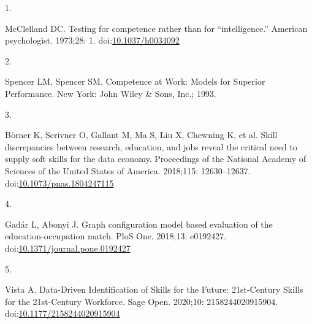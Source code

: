 \documentclass[10pt,letterpaper]{article}
\newlength{\cslhangindent}
\newlength{\csllabelwidth}
\newenvironment{CSLReferences}[2] %
 {\begin{list}{}{%
  \setlength{\itemindent}{0pt}
  \setlength{\leftmargin}{0pt}
  \setlength{\parsep}{0pt}
  \ifodd #1
   \setlength{\leftmargin}{\cslhangindent}
   \setlength{\itemindent}{-1\cslhangindent}
  \fi
  \setlength{\itemsep}{#2\baselineskip}}}
 {\end{list}}
\newcommand{\CSLLeftMargin}[1]{\parbox[t]{\csllabelwidth}{#1}}
\newcommand{\CSLRightInline}[1]{\parbox[t]{\linewidth - \csllabelwidth}{#1}\break}
\begin{document}
\label{refs}
\begin{CSLReferences}{0}{1}
\CSLLeftMargin{1. }%
\CSLRightInline{McClelland DC. Testing for competence rather than for
{``intelligence.''} American psychologist. 1973;28: 1.
doi:\href{https://doi.org/10.1037/h0034092}{10.1037/h0034092}}

\CSLLeftMargin{2. }%
\CSLRightInline{Spencer LM, Spencer SM. {Competence at Work: Models for
Superior Performance}. New York: John Wiley \& Sons, Inc.; 1993. }

\CSLLeftMargin{3. }%
\CSLRightInline{Börner K, Scrivner O, Gallant M, Ma S, Liu X, Chewning
K, et al. Skill discrepancies between research, education, and jobs
reveal the critical need to supply soft skills for the data economy.
Proceedings of the National Academy of Sciences of the United States of
America. 2018;115: 12630--12637.
doi:\href{https://doi.org/10.1073/pnas.1804247115}{10.1073/pnas.1804247115}}

\CSLLeftMargin{4. }%
\CSLRightInline{Gadár L, Abonyi J. Graph configuration model based
evaluation of the education-occupation match. PloS One. 2018;13:
e0192427.
doi:\href{https://doi.org/10.1371/journal.pone.0192427}{10.1371/journal.pone.0192427}}

\CSLLeftMargin{5. }%
\CSLRightInline{Vista A. {Data-Driven Identification of Skills for the
Future: 21st-Century Skills for the 21st-Century Workforce}. Sage Open.
2020;10: 2158244020915904.
doi:\href{https://doi.org/10.1177/2158244020915904}{10.1177/2158244020915904}}

\end{CSLReferences}

\nolinenumbers
\end{document}
